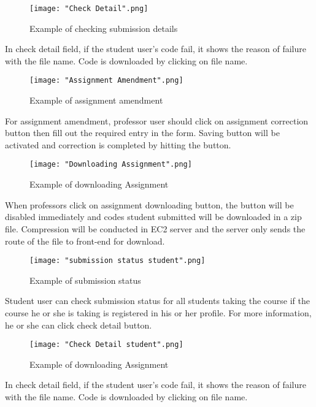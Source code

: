 \documentclass[10pt,journal,compsoc]{IEEEtran}
\begin{document}
\begin{figure}[H]
\centering
\texttt{[image: "Check Detail".png]}
{\caption*{Example of checking submission details}}
\end{figure}
In check detail field, if the student user’s code fail, it shows the reason of failure with the file name. Code is downloaded by clicking on file name. 
\begin{figure}[H]
\centering
\texttt{[image: "Assignment Amendment".png]}
{\caption*{Example of assignment amendment}}
\end{figure}
For assignment amendment, professor user should click on assignment correction button then fill out the required entry in the form. Saving button will be activated and correction is completed by hitting the button. 

\begin{figure}[H]
\centering
\texttt{[image: "Downloading Assignment".png]}
{\caption*{Example of downloading Assignment}}
\end{figure}
When professors click on assignment downloading button, the button will be disabled immediately and codes student submitted will be downloaded in a zip file. Compression will be conducted in EC2 server and the server only sends the route of the file to front-end for download.

\begin{figure}[H]
\centering
\texttt{[image: "submission status student".png]}
{\caption*{Example of submission status}}
\end{figure}
Student user can check submission status for all students taking the course if the course he or she is taking is registered in his or her profile. For more information, he or she can click check detail button.

\begin{figure}[H]
\centering
\texttt{[image: "Check Detail student".png]}
{\caption*{Example of downloading Assignment}}
\end{figure}

In check detail field, if the student user’s code fail, it shows the reason of failure with the file name. Code is downloaded by clicking on file name.
\bigskip
\bigskip

\ifCLASSOPTIONcompsoc
{}
\else
\end{document}
